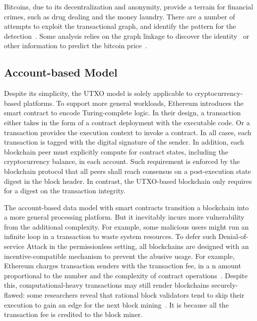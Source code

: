 Bitcoins, due to its decentralization and anonymity, provide a terrain for financial crimes, such as drug dealing and the money laundry. There are a number of attempts to exploit the transactional graph, and identify the pattern for the detection~\cite{fleder2015bitcoin,ron2013quantitative,weber2019anti}. 
Some analysis relies on the graph linkage to discover the identity~\cite{ober2013structure,gaihre2018bitcoin,moser2013anonymity} or other information to predict the bitcoin price~\cite{greaves2015using}. 

\subsection{Account-based Model}
Despite its simplicity, the UTXO model is solely applicable to cryptocurrency-based platforms. 
To support more general workloads, Ethereum introduces the smart contract to encode Turing-complete logic. 
In their design, a transaction either takes in the form of a contract deployment with the executable code. 
Or a transaction provides the execution context to invoke a contract. 
In all cases, each transaction is tagged with the digital signature of the sender. 
In addition, each blockchain peer must explicitly compute for contract states, including the cryptocurrency balance, in each account. 
Such requirement is enforced by the blockchain protocol that all peers shall reach consensus on a post-execution state digest in the block header. 
In contrast, the UTXO-based blockchain only requires for a digest on the transaction integrity.

The account-based data model with smart contracts transition a blockchain into a more general processing platform. 
But it inevitably incurs more vulnerability from the additional complexity. 
For example, some malicious users might run an infinite loop in a transaction to waste system resources. 
To defer such Denial-of-service Attack in the permissionless setting, all blockchains are designed with an incentive-compatible mechanism to prevent the abusive usage. 
For example, Ethereum charges transaction senders with the transaction fee, in a n amount proportional to the number and the complexity of contract operations~\cite{wood2014ethereum}.
Despite this, computational-heavy transactions may still render blockchains securely-flawed: some researchers reveal that rational block validators tend to skip their execution to gain an edge for the next block mining~\cite{luu2015demystifying}.
It is because all the transaction fee is credited to the block miner. 

